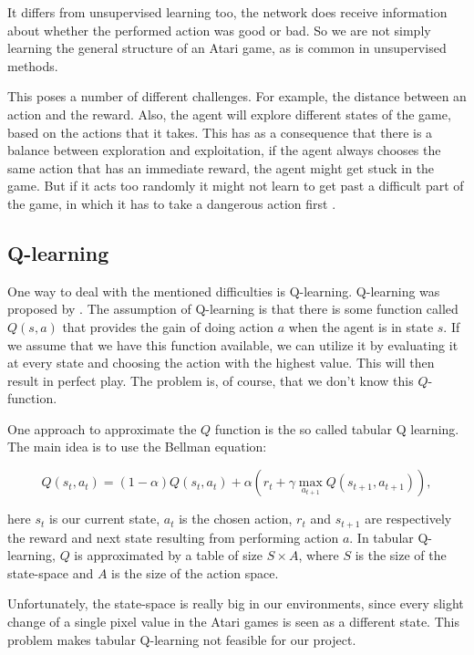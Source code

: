 \documentclass{article}
\begin{document}
It differs from unsupervised learning too, the network does receive information about whether the performed action was good or bad. So we are not simply learning the general structure of an Atari game, as is common in unsupervised methods.

This poses a number of different challenges. For example, the distance between an action and the reward. Also, the agent will explore different states of the game, based on the actions that it takes. This has as a consequence that there is a balance between exploration and exploitation, if the agent always chooses the same action that has an immediate reward, the agent might get stuck in the game. But if it acts too randomly it might not learn to get past a difficult part of the game, in which it has to take a dangerous action first \cite{reinforcementLearningDraft}.

\subsection{Q-learning}

One way to deal with the mentioned difficulties is Q-learning. Q-learning was proposed by \citeauthor{watkins1992q} \cite{watkins1992}. The assumption of Q-learning is that there is some function called $Q(s, a)$ that provides the gain of doing action $a$ when the agent is in state $s$. If we assume that we have this function available, we can utilize it by evaluating it at every state and choosing the action with the highest value. This will then result in perfect play. The problem is, of course, that we don't know this $Q$-function. 

One approach to approximate the $Q$ function is the so called tabular Q learning. The main idea is to use the Bellman equation: 

\[
	Q(s_t,a_t) = (1 - \alpha) Q(s_t, a_t) + \alpha(r_t + \gamma \max_{a_{t+1}} Q(s_{t+1},a_{t+1})),
\]

here $s_t$ is our current state, $a_t$ is the chosen action, $r_t$ and $s_{t+1}$ are respectively the reward and next state resulting from performing action $a$. In tabular Q-learning, $Q$ is approximated by a table of size $S \times A$, where $S$ is the size of the state-space and $A$ is the size of the action space. 

Unfortunately, the state-space is really big in our environments, since every slight change of a single pixel value in the Atari games is seen as a different state. This problem makes tabular Q-learning not feasible for our project.
\end{document}
